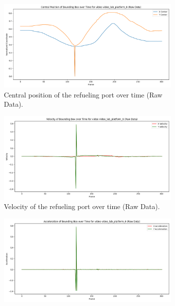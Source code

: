 \documentclass[12pt,oneside]{book} %
\begin{document}
\begin{figure}[H]
    \centering
    \begin{subfigure}[t]{0.45\textwidth}
        \includegraphics[width=\textwidth]{figures/bbox_metrics/video_lab_platform_6 (Raw Data)_central_position.png}
        \caption{Central position of the refueling port over time (Raw Data).}
        \label{fig:central-position-test-video_lab_platform_6}
    \end{subfigure}
    \hfill
    \begin{subfigure}[t]{0.45\textwidth}
        \includegraphics[width=\textwidth]{figures/bbox_metrics/video_lab_platform_6 (Raw Data)_velocity.png}
        \caption{Velocity of the refueling port over time (Raw Data).}
        \label{fig:velocity-test-video_lab_platform_6}
    \end{subfigure}
    \vfill
    \begin{subfigure}[t]{0.45\textwidth}
        \includegraphics[width=\textwidth]{figures/bbox_metrics/video_lab_platform_6 (Raw Data)_acceleration.png}

\end{subfigure}
\end{figure}
\end{document}
